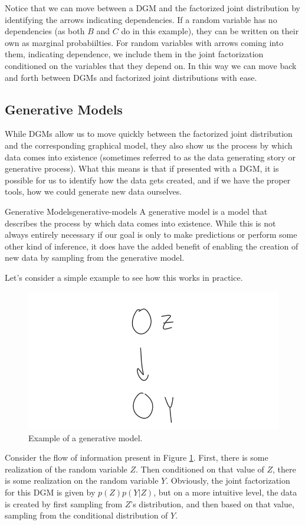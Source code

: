Notice that we can move between a DGM and the factorized joint distribution by identifying the arrows indicating dependencies. If a random variable has no dependencies (as both $B$ and $C$ do in this example), they can be written on their own as marginal probabiilties. For random variables with arrows coming into them, indicating dependence, we include them in the joint factorization conditioned on the variables that they depend on. In this way we can move back and forth between DGMs and factorized joint distributions with ease.

\subsection{Generative Models}
While DGMs allow us to move quickly between the factorized joint distribution and the corresponding graphical model, they also show us the process by which data comes into existence (sometimes referred to as the data generating story or generative process). What this means is that if presented with a DGM, it is possible for us to identify how the data gets created, and if we have the proper tools, how we could generate new data ourselves.

\begin{definition}{Generative Models}{generative-models}
    A generative model is a model that describes the process by which data comes into existence. While this is not always entirely necessary if our goal is only to make predictions or perform some other kind of inference, it does have the added benefit of enabling the creation of new data by sampling from the generative model.
\end{definition}

Let's consider a simple example to see how this works in practice.
\begin{figure}
    \centering
    \includegraphics[width=0.5\paperwidth]{../GraphicalModels/fig/GenerativeRVExample.png}
    \caption{Example of a generative model.}
    \label{fig:generative-rv}
\end{figure}
Consider the flow of information present in Figure \ref{fig:generative-rv}. First, there is some realization of the random variable $Z$. Then conditioned on that value of $Z$, there is some realization on the random variable $Y$. Obviously, the joint factorization for this DGM is given by $p(Z)p(Y|Z)$, but on a more intuitive level, the data is created by first sampling from $Z$'s distribution, and then based on that value, sampling from the conditional distribution of $Y$.

